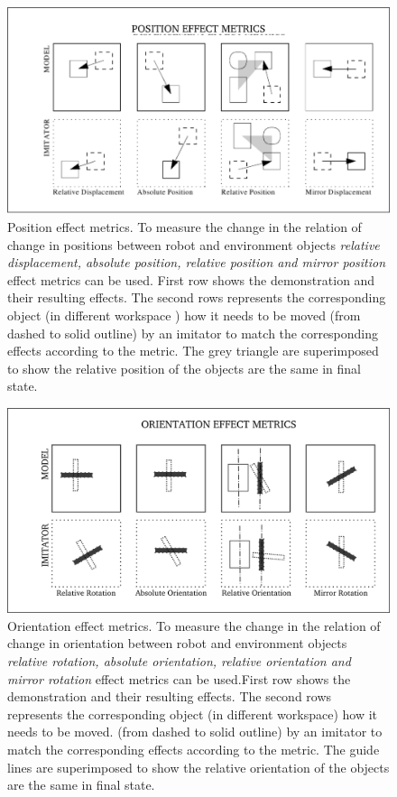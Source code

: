 \begin{figure}[htp]
\centering
\includegraphics[scale=0.70]{images/position_effect_metrics.png}
\caption[Position effect metrics]{Position effect metrics.
 To measure the change in the relation of change in positions between 
robot and environment objects 
\textit{relative displacement, absolute position, relative position and mirror position}
 effect metrics can be used. First row shows the demonstration and
 their resulting effects. The second rows represents the
 corresponding object (in different workspace ) how it needs to be
 moved (from dashed to solid outline) by an imitator to match the 
corresponding effects according to the metric. The grey triangle
 are superimposed to show the relative position of the objects are 
the same in final state. \cite{alissandrakis_action_2006} }
\label{position effect metrics}
\end{figure}
\begin{figure}[htp]
\centering
\includegraphics[scale=0.70]{images/angular_effect_metrics.png}
\caption[Orientation effect metrics]{Orientation effect metrics.  To measure the change in the relation of change in orientation between robot and environment objects \textit{relative rotation, absolute orientation, relative orientation and mirror rotation} effect metrics can be used.First row shows the demonstration and their resulting effects. The second rows represents the corresponding object (in different workspace) how it needs to be moved. (from dashed to solid outline) by an imitator to match the corresponding effects according to the metric. The guide lines are superimposed to show the relative orientation of the objects are the same in final state. \cite{ alissandrakis_action_2006}}
\label{orientation effect metrics}
\end{figure}

